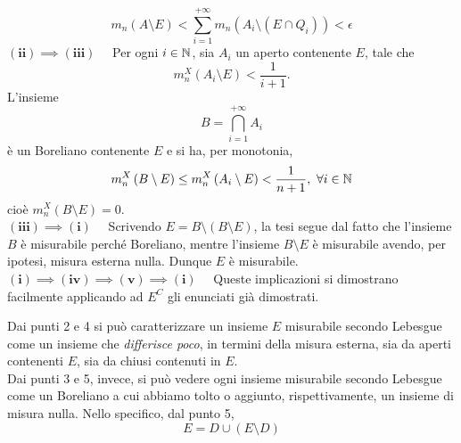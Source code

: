 \begin{demonstration}
\begin{equation*}
	m_n\left(A\setminus E\right)<\sum_{i=1}^{+\infty}m_n\left(A_i\setminus\left(E\cap Q_i\right)\right)<\epsilon
\end{equation*}
$\mathbf{(ii)\implies(iii)}\quad$ Per ogni $i\in\mathbb{N}$, sia $A_i$ un aperto contenente $E$, tale che
\begin{equation*}
	m^{X}_n\left(A_i\setminus E\right)<\frac{1}{i+1}.
\end{equation*}
L'insieme
\begin{equation*}
	B=\bigcap_{i=1}^{+\infty}A_i
\end{equation*}
è un Boreliano contenente $E$ e si ha, per monotonia,
\begin{equation*}
	m_n^{X}\left(B\setminus E\right)\leq m_n^{X}\left(A_i\setminus E\right)<\frac{1}{n+1},\ \forall i\in \mathbb{N}
\end{equation*}
cioè $m_n^{X}\left(B\setminus E\right)=0$.\\
$\mathbf{(iii)\implies(i)}\quad$  Scrivendo $E=B\setminus\left(B\setminus E\right)$, la tesi segue dal fatto che l'insieme $B$ è misurabile perché Boreliano, mentre l'insieme $B\setminus E$ è misurabile avendo, per ipotesi, misura esterna nulla. Dunque $E$ è misurabile.\\
$\mathbf{(i)\implies(iv)\implies(v)\implies(i)}\quad$ Queste implicazioni si dimostrano facilmente applicando ad $E^C$ gli enunciati già dimostrati. 
\end{demonstration}
\begin{observe}
	Dai punti 2 e 4 si può caratterizzare un insieme $E$ misurabile secondo Lebesgue come un insieme che \textit{differisce poco}, in termini della misura esterna, sia da aperti contenenti $E$, sia da chiusi contenuti in $E$.\\
	Dai punti 3 e 5, invece, si può vedere ogni insieme misurabile secondo Lebesgue come un Boreliano a cui abbiamo tolto o aggiunto, rispettivamente, un insieme di misura nulla. Nello specifico, dal punto 5,
	\begin{equation*}
		E=D\cup\left(E\setminus D\right)
	\end{equation*}
\end{observe}
